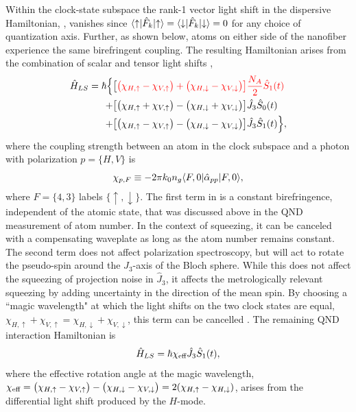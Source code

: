 \documentclass[preprint,aps,pra,onecolumn]{revtex4-1} %
\newcommand{\change}[1]{{\color{RoyalBlue} #1}}
\newcommand{\error}[1]{{\color{red} #1}}
\begin{document}
Within the clock-state subspace the rank-1 vector light shift in the dispersive Hamiltonian, , vanishes since $\langle{\uparrow}\rvert \hat{F}_k \lvert{\uparrow}\rangle =\langle{\downarrow}\rvert \hat{F}_k \lvert{\downarrow}\rangle = 0$ for any choice of quantization axis. Further, as shown below, atoms on either side of the nanofiber experience the same birefringent coupling. The resulting Hamiltonian arises from the combination of scalar and tensor light shifts \cite{chaudhury_continuous_2006},
	\begin{align} \label{Eq::ClockHamiltonian}
		\hat{H}_{LS} = \hbar \Big\{ %
		 & \big[ \error{ \big( \chi_{H, \uparrow} - \chi_{V,\uparrow} \big) + \big(\chi_{H,\downarrow} - \chi_{V,\downarrow} \big)\big]  \frac{N_A}{2}\hat{S}_1(t) } \\
		+ & \big[ \big( \chi_{H,\uparrow} +\chi_{V,\uparrow} \big) - \big( \chi_{H,\downarrow} + \chi_{V,\downarrow}\big) \big] \hat{J}_3 \hat{S}_0(t) \nonumber \\
		+ & \big[  \big( \chi_{H, \uparrow} - \chi_{V,\uparrow} \big) - \big(\chi_{H,\downarrow} - \chi_{V,\downarrow} \big) \big]  \hat{J}_3 \hat{S}_1(t) \Big\}, \nonumber
	\end{align}
where the coupling strength between an atom in the clock subspace and a photon with polarization $p = \{H,V\}$ is
	\begin{equation} \label{Eq::ClockCouplingStrength}
		\chi_{p,F} \equiv - 2\pi k_0 n_g  \langle{F,0}\rvert\hat{\alpha}_{pp}  \lvert{F,0}\rangle,
	\end{equation}
where $F = \{4,3\}$ labels $\{\uparrow,\downarrow\}$.  The first term in  is a constant birefringence, independent of the atomic state, that was discussed above in the QND measurement of atom number.  In the context of squeezing, it can be canceled with a compensating waveplate \change{ as long as the atom number remains constant}. The second term does not affect polarization spectroscopy, but will act to rotate the pseudo-spin around the $J_3$-axis of the Bloch sphere.  While this does not affect the squeezing of projection noise in $\hat{J}_3$, it affects the metrologically relevant squeezing by adding uncertainty in the direction of the mean spin.  By choosing a ``magic wavelength" at which the light shifts on the two clock states are equal, $\chi_{H,\uparrow} +\chi_{V,\uparrow}  = \chi_{H,\downarrow} + \chi_{V,\downarrow}$, this term can be cancelled \cite{chaudhury_continuous_2006}. The remaining QND interaction Hamiltonian is
	\begin{equation} \label{Eq::FaradayHam}
		\hat{H}_{LS} = \hbar \chi_{\text{eff}} \hat{J}_3 \hat{S}_1(t),
	\end{equation}
where the effective rotation angle at the magic wavelength,
$\chi_{\text{eff}} = \big( \chi_{H, \uparrow} - \chi_{V,\uparrow} \big) - \big(\chi_{H,\downarrow} - \chi_{V,\downarrow} \big) = 2(\chi_{H, \uparrow}-\chi_{H, \downarrow})$, arises from the differential light shift produced by the $H$-mode.  
\end{document}
